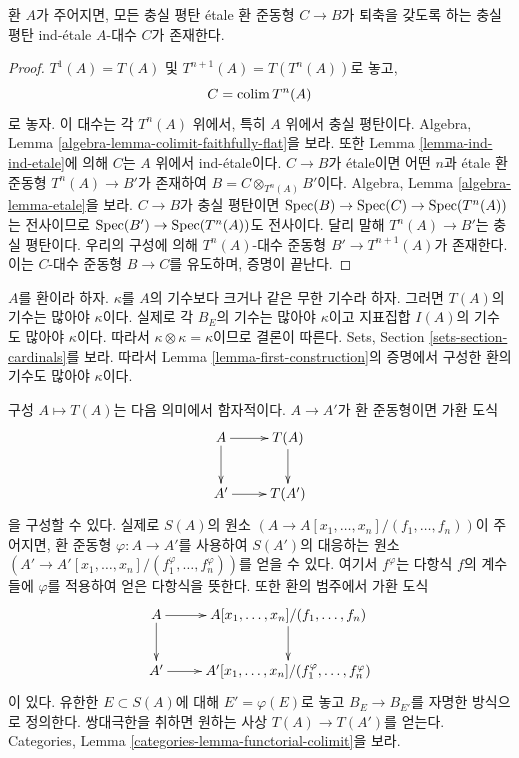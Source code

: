 \begin{lemma}
\label{lemma-first-construction}
환 $A$가 주어지면, 모든 충실 평탄 \'etale 환 준동형 $C \to B$가
퇴축을 갖도록 하는 충실 평탄 ind-\'etale $A$-대수 $C$가 존재한다.
\end{lemma}

\begin{proof}
$T^1(A) = T(A)$ 및 $T^{n + 1}(A) = T(T^n(A))$로 놓고,
$$
C = \mathop{\mathrm{colim}}\nolimits T^n(A)
$$
로 놓자. 이 대수는 각 $T^n(A)$ 위에서, 특히 $A$ 위에서 충실 평탄이다.
Algebra, Lemma \ref{algebra-lemma-colimit-faithfully-flat}을 보라.
또한 Lemma \ref{lemma-ind-ind-etale}에 의해 $C$는 $A$ 위에서
ind-\'etale이다. $C \to B$가 \'etale이면 어떤 $n$과 \'etale 환 준동형
$T^n(A) \to B'$가 존재하여 $B = C \otimes_{T^n(A)} B'$이다.
Algebra, Lemma \ref{algebra-lemma-etale}을 보라.
$C \to B$가 충실 평탄이면
$\mathop{\mathrm{Spec}}(B) \to \mathop{\mathrm{Spec}}(C) \to \mathop{\mathrm{Spec}}(T^n(A))$는 전사이므로
$\mathop{\mathrm{Spec}}(B') \to \mathop{\mathrm{Spec}}(T^n(A))$도 전사이다.
달리 말해 $T^n(A) \to B'$는 충실 평탄이다.
우리의 구성에 의해 $T^n(A)$-대수 준동형
$B' \to T^{n + 1}(A)$가 존재한다. 이는 $C$-대수 준동형
$B \to C$를 유도하며, 증명이 끝난다.
\end{proof}

\begin{remark}
\label{remark-size-T}
$A$를 환이라 하자. $\kappa$를 $A$의 기수보다 크거나 같은
무한 기수라 하자. 그러면 $T(A)$의 기수는 많아야 $\kappa$이다.
실제로 각 $B_E$의 기수는 많아야 $\kappa$이고 지표집합 $I(A)$의
기수도 많아야 $\kappa$이다. 따라서
$\kappa \otimes \kappa = \kappa$이므로 결론이 따른다.
Sets, Section \ref{sets-section-cardinals}를 보라. 따라서 Lemma
\ref{lemma-first-construction}의 증명에서 구성한 환의 기수도
많아야 $\kappa$이다.
\end{remark}

\begin{remark}
\label{remark-first-construction-functorial}
구성 $A \mapsto T(A)$는 다음 의미에서 함자적이다.
$A \to A'$가 환 준동형이면 가환 도식
$$
\xymatrix{
A \ar[r] \ar[d] & T(A) \ar[d] \\
A' \ar[r] & T(A')
}
$$
을 구성할 수 있다. 실제로 $S(A)$의 원소
$(A \to A[x_1, \ldots, x_n]/(f_1, \ldots, f_n))$이 주어지면,
환 준동형 $\varphi : A \to A'$를 사용하여 $S(A')$의 대응하는 원소
$(A' \to A'[x_1, \ldots, x_n]/(f^\varphi_1, \ldots, f^\varphi_n))$를
얻을 수 있다. 여기서 $f^\varphi$는 다항식 $f$의 계수들에
$\varphi$를 적용하여 얻은 다항식을 뜻한다. 또한 환의 범주에서
가환 도식
$$
\xymatrix{
A \ar[r] \ar[d] & A[x_1, \ldots, x_n]/(f_1, \ldots, f_n) \ar[d] \\
A' \ar[r] & A'[x_1, \ldots, x_n]/(f^\varphi_1, \ldots, f^\varphi_n)
}
$$
이 있다. 유한한 $E \subset S(A)$에 대해 $E' = \varphi(E)$로 놓고
$B_E \to B_{E'}$를 자명한 방식으로 정의한다.
쌍대극한을 취하면 원하는 사상 $T(A) \to T(A')$를 얻는다.
Categories, Lemma \ref{categories-lemma-functorial-colimit}을 보라.
\end{remark}

